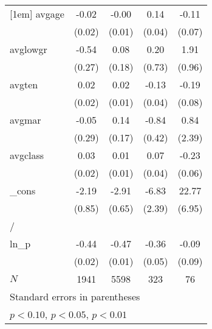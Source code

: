 \documentclass{article}
\begin{document}
{\begin{tabular}{l*{4}{c}}
[1em]
avgage      &       -0.02         &       -0.00         &        0.14\sym{***}&       -0.11         \\
            &      (0.02)         &      (0.01)         &      (0.04)         &      (0.07)         \\
[1em]
avglowgr    &       -0.54\sym{*}  &        0.08         &        0.20         &        1.91\sym{**} \\
            &      (0.27)         &      (0.18)         &      (0.73)         &      (0.96)         \\
[1em]
avgten      &        0.02         &        0.02         &       -0.13\sym{***}&       -0.19\sym{**} \\
            &      (0.02)         &      (0.01)         &      (0.04)         &      (0.08)         \\
[1em]
avgmar      &       -0.05         &        0.14         &       -0.84\sym{**} &        0.84         \\
            &      (0.29)         &      (0.17)         &      (0.42)         &      (2.39)         \\
[1em]
avgclass    &        0.03\sym{*}  &        0.01         &        0.07\sym{*}  &       -0.23\sym{***}\\
            &      (0.02)         &      (0.01)         &      (0.04)         &      (0.06)         \\
[1em]
\_cons      &       -2.19\sym{***}&       -2.91\sym{***}&       -6.83\sym{***}&       22.77\sym{***}\\
            &      (0.85)         &      (0.65)         &      (2.39)         &      (6.95)         \\
\hline
/           &                     &                     &                     &                     \\
ln\_p        &       -0.44\sym{***}&       -0.47\sym{***}&       -0.36\sym{***}&       -0.09         \\
            &      (0.02)         &      (0.01)         &      (0.05)         &      (0.09)         \\
\hline
\(N\)       &        1941         &        5598         &         323         &          76         \\
\hline\hline
\multicolumn{5}{l}{\footnotesize Standard errors in parentheses}\\
\multicolumn{5}{l}{\footnotesize \sym{*} \(p<0.10\), \sym{**} \(p<0.05\), \sym{***} \(p<0.01\)}\\
\end{tabular}
}
\end{document}
